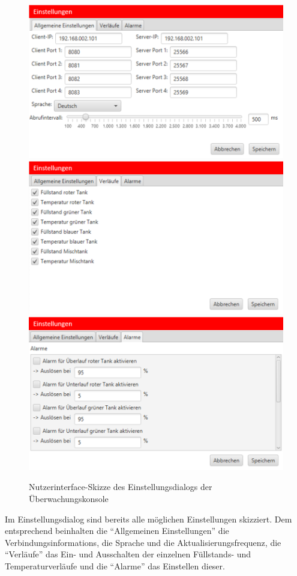 \documentclass[parskip=full]{scrartcl}
\begin{document}
\begin{figure}[H]
	\centering
	\includegraphics[scale=0.5]{media/ui-client/ui-uw-settings1.png}
	\includegraphics[scale=0.5]{media/ui-client/ui-uw-settings2.png}
	\includegraphics[scale=0.5]{media/ui-client/ui-uw-settings3.png}
	\caption{Nutzerinterface-Skizze des Einstellungsdialogs der Überwachungskonsole}
\end{figure}
Im Einstellungsdialog sind bereits alle möglichen Einstellungen skizziert. Dem entsprechend beinhalten die "`Allgemeinen Einstellungen"' die \glspl{Verbindungsinformation}, die Sprache und die Aktualisierungsfrequenz, die "`Verläufe"' das Ein- und Ausschalten der einzelnen Füllstands- und Temperaturverläufe und die "`Alarme"' das Einstellen dieser.
\end{document}
